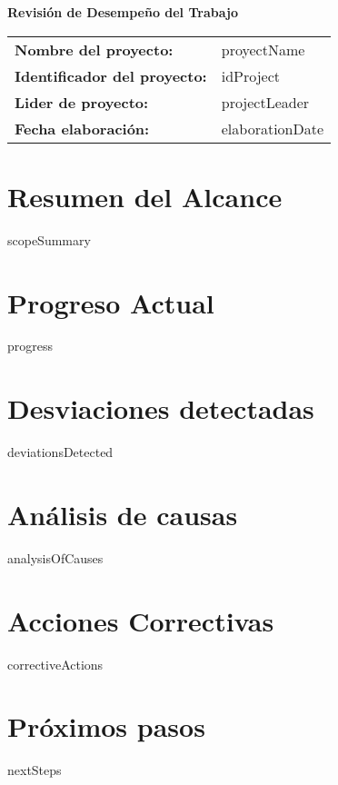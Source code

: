 \documentclass{article}
\begin{document}
\begin{center}
{\huge\textbf{Revisión de Desempeño del Trabajo}}\\[14cm]
\end{center}

\newcommand{\wrappingmulticolumn}[3]
    {\multicolumn{#1}
                 {|>{\hsize=\dimexpr#1\hsize+\tabcolsep * (2 * (#1 - 1) )+\arrayrulewidth* (#1 - 2)\relax}#2|}
                 {#3}}
\renewcommand{\arraystretch}{1.5} %

\begin{tabular}{|ll|} \hline
\rowcolor{gray!10}\textbf{Nombre del proyecto:} & {{proyectName}} \\[0.3cm]
\textbf{Identificador del proyecto:} & {{idProject}} \\[0.3cm]
\textbf{Lider de proyecto:} & {{projectLeader}} \\[0.3cm]
\textbf{Fecha elaboración:} & {{elaborationDate}} \\ \hline
\end{tabular}

\newpage

\tableofcontents
\newpage

\section{Resumen del Alcance}
{{scopeSummary}}

\section{Progreso Actual}
{{progress}}

\section{Desviaciones detectadas}
{{deviationsDetected}}

\section{Análisis de causas}
{{analysisOfCauses}}

\section{Acciones Correctivas}
{{correctiveActions}}

\section{Próximos pasos}
{{nextSteps}}
\end{document}
